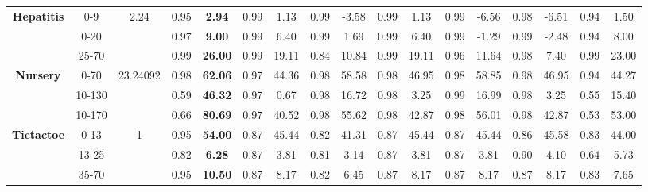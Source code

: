 \documentclass[letterpaper]{article}
\theoremstyle{definition}
\begin{document}
\begin{table}[t]
\begin{tabular}{|c|c|c|c|c|c|c|c|c|c|c|c|c|c|c|c|c|}
\multirow{3}{*}{\textbf{Hepatitis}} & 0-9       & 2.24      & 0.95  & \textbf{2.94}    & 0.99      & 1.13         & 0.99   & -3.58             & 0.99      & 1.13         & 0.99      & -6.56        & 0.98         & -6.51          & 0.94   & 1.50             \\ \cline{2-17} 
                                    & 0-20      &           & 0.97  & \textbf{9.00}    & 0.99      & 6.40         & 0.99   & 1.69              & 0.99      & 6.40         & 0.99      & -1.29        & 0.99         & -2.48          & 0.94   & 8.00             \\ \cline{2-17} 
                                    & 25-70     &           & 0.99  & \textbf{26.00}   & 0.99      & 19.11        & 0.84   & 10.84             & 0.99      & 19.11        & 0.96      & 11.64        & 0.98         & 7.40           & 0.99   & 23.00            \\ \hline
\multirow{3}{*}{\textbf{Nursery}}   & 0-70      & 23.24092  & 0.98  & \textbf{62.06}   & 0.97      & 44.36        & 0.98   & 58.58             & 0.98      & 46.95        & 0.98      & 58.85        & 0.98         & 46.95          & 0.94   & 44.27            \\ \cline{2-17} 
                                    & 10-130    &           & 0.59  & \textbf{46.32}   & 0.97      & 0.67         & 0.98   & 16.72             & 0.98      & 3.25         & 0.99      & 16.99        & 0.98         & 3.25           & 0.55   & 15.40            \\ \cline{2-17} 
                                    & 10-170    &           & 0.66  & \textbf{80.69}   & 0.97      & 40.52        & 0.98   & 55.62             & 0.98      & 42.87        & 0.98      & 56.01        & 0.98         & 42.87          & 0.53   & 53.00            \\ \hline
\multirow{3}{*}{\textbf{Tictactoe}} & 0-13      & 1         & 0.95  & \textbf{54.00}   & 0.87      & 45.44        & 0.82   & 41.31             & 0.87      & 45.44        & 0.87      & 45.44        & 0.86         & 45.58          & 0.83   & 44.00            \\ \cline{2-17} 
                                    & 13-25     &           & 0.82  & \textbf{6.28}    & 0.87      & 3.81         & 0.81   & 3.14              & 0.87      & 3.81         & 0.87      & 3.81         & 0.90         & 4.10           & 0.64   & 5.73             \\ \cline{2-17} 
                                    & 35-70     &           & 0.95  & \textbf{10.50}   & 0.87      & 8.17         & 0.82   & 6.45              & 0.87      & 8.17         & 0.87      & 8.17         & 0.87         & 8.17           & 0.83   & 7.65             \\ \hline

\end{tabular}
\end{table}
\end{document}
